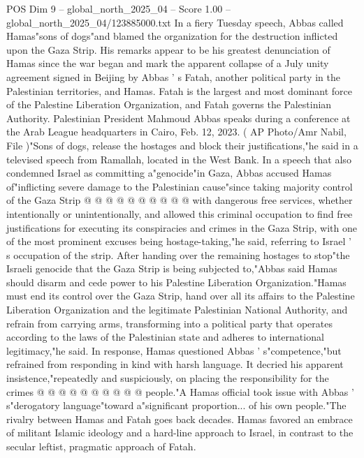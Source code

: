 \begin{textsample}{POS Dim 9 – global\_north\_2025\_04 – Score 1.00 – global\_north\_2025\_04/123885000.txt}  \label{ex:f9_pos_324}
In a fiery Tuesday speech, Abbas called Hamas"sons of dogs"and blamed the organization for the destruction inflicted upon the Gaza Strip.
His remarks appear to be his greatest denunciation of Hamas since the war began and mark the apparent collapse of a July unity agreement signed in Beijing by Abbas ' s Fatah, another political party in the Palestinian territories, and Hamas.
Fatah is the largest and most dominant force of the Palestine Liberation Organization, and Fatah governs the Palestinian Authority.
Palestinian President Mahmoud Abbas speaks during a conference at the Arab League headquarters in Cairo, Feb. 12, 2023. ( AP Photo/Amr Nabil, File )"Sons of dogs, release the hostages and block their justifications,"he said in a televised speech from Ramallah, located in the West Bank.
In a speech that also condemned Israel as committing a"genocide"in Gaza, Abbas accused Hamas of"inflicting severe damage to the Palestinian cause"since taking majority control of the Gaza Strip @ @ @ @ @ @ @ @ @ @ with dangerous free services, whether intentionally or unintentionally, and allowed this criminal occupation to find free justifications for executing its conspiracies and crimes in the Gaza Strip, with one of the most prominent excuses being hostage-taking,"he said, referring to Israel ' s occupation of the strip.
After handing over the remaining hostages to stop"the Israeli genocide that the Gaza Strip is being subjected to,"Abbas said Hamas should disarm and cede power to his Palestine Liberation Organization."Hamas must end its control over the Gaza Strip, hand over all its affairs to the Palestine Liberation Organization and the legitimate Palestinian National Authority, and refrain from carrying arms, transforming into a political party that operates according to the laws of the Palestinian state and adheres to international legitimacy,"he said.
In response, Hamas questioned Abbas ' s"competence,"but refrained from responding in kind with harsh language.
It decried his apparent insistence,"repeatedly and suspiciously, on placing the responsibility for the crimes @ @ @ @ @ @ @ @ @ @ people."A Hamas official took issue with Abbas ' s"derogatory language"toward a"significant proportion... of his own people."The rivalry between Hamas and Fatah goes back decades.
Hamas favored an embrace of militant Islamic ideology and a hard-line approach to Israel, in contrast to the secular leftist, pragmatic approach of Fatah.

\end{textsample}
